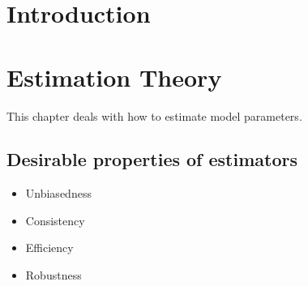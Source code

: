 \documentclass[a4paper, one	side]{book}
\begin{document}
\chapter*{Introduction}


\chapter{Estimation Theory}

This chapter deals with how to estimate model parameters. 

\section{Desirable properties of estimators}
\begin{itemize}
\item Unbiasedness 
\item Consistency
\item Efficiency
\item Robustness
\end{itemize}
\end{document}
